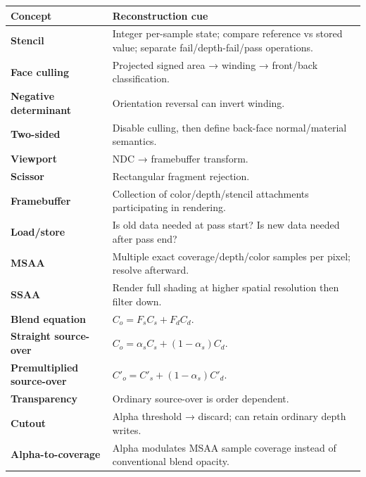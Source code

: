 {\def\LTcaptype{none} %
\begin{longtable}[]{@{}
  >{\raggedright\arraybackslash}p{}
  >{\raggedright\arraybackslash}p{}@{}}
\toprule\noalign{}
\begin{minipage}[b]{\linewidth}\raggedright
Concept
\end{minipage} & \begin{minipage}[b]{\linewidth}\raggedright
Reconstruction cue
\end{minipage} \\
\midrule\noalign{}
\endhead
\bottomrule\noalign{}
\endlastfoot
\textbf{Stencil} & Integer per-sample state; compare reference vs stored value; separate fail/depth-fail/pass operations. \\
\textbf{Face culling} & Projected signed area → winding → front/back classification. \\
\textbf{Negative determinant} & Orientation reversal can invert winding. \\
\textbf{Two-sided} & Disable culling, then define back-face normal/material semantics. \\
\textbf{Viewport} & NDC → framebuffer transform. \\
\textbf{Scissor} & Rectangular fragment rejection. \\
\textbf{Framebuffer} & Collection of color/depth/stencil attachments participating in rendering. \\
\textbf{Load/store} & Is old data needed at pass start? Is new data needed after pass end? \\
\textbf{MSAA} & Multiple exact coverage/depth/color samples per pixel; resolve afterward. \\
\textbf{SSAA} & Render full shading at higher spatial resolution then filter down. \\
\textbf{Blend equation} & \(C_o=F_sC_s+F_dC_d\). \\
\textbf{Straight source-over} & \(C_o=\alpha_sC_s+(1-\alpha_s)C_d\). \\
\textbf{Premultiplied source-over} & \(C'_o=C'_s+(1-\alpha_s)C'_d\). \\
\textbf{Transparency} & Ordinary source-over is order dependent. \\
\textbf{Cutout} & Alpha threshold → discard; can retain ordinary depth writes. \\
\textbf{Alpha-to-coverage} & Alpha modulates MSAA sample coverage instead of conventional blend opacity. \\

\end{longtable}}

